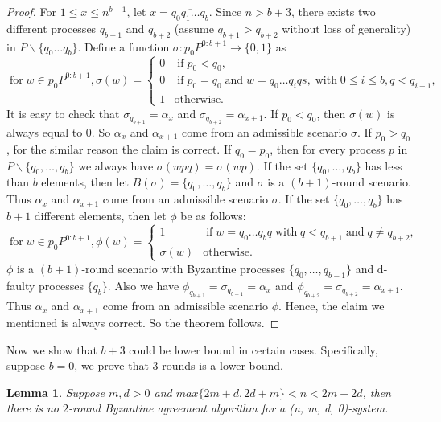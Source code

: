 \documentclass[11pt,conference,compsoc,onecolumn,romanappendices]{IEEEtran}
\newcommand{\nocomma}{}
\newcommand{\tmop}[1]{\ensuremath{\operatorname{#1}}}
\newtheorem{lemma}{Lemma}
\begin{document}
\begin{proof}
  For $1 \leqslant x \leqslant n^{b + 1}$, let $x = \overline{q_0 q_1 \ldots
  q_b}$. Since $n > b + 3$, there exists two different processes $q_{b + 1}$
  and $q_{b + 2}$ (assume $q_{b + 1} > q_{b + 2}$ without loss of generality)
  in $P \backslash \{ q_0 \ldots q_b \}$. Define a function $\sigma : p_0 P^{0 : b +
  1} \rightarrow \{ 0, 1 \}$ as
  \[ \tmop{for} w \in p_0 P^{0 : b + 1} \nocomma, \sigma (w) = \left\{
     \begin{array}{ll}
       0 & \tmop{if} p_0 < q_0,\\
       0 & \tmop{if} p_0 = q_0 \tmop{and} w = q_0 \ldots q_i q s, \tmop{with}
       0 \leqslant i \leqslant b, q < q_{i + 1},\\
       1 & \tmop{otherwise.}
     \end{array} \right. \]
  It is easy to check that $\sigma_{q_{b + 1}} = \alpha_x$ and $\sigma_{q_{b +
  2}} = \alpha_{x + 1}$. If $p_0 < q_0$, then $\sigma (w)$ is always equal to
  $0$. So $\alpha_x$ and $\alpha_{x + 1}$ come from an admissible scenario
  $\sigma$. If $p_0 > q_0$, for the similar reason the claim is correct. If
  $q_0 = p_0$, then for every process $p$ in $P \backslash \{ q_0, \ldots, q_b \}$ we
  always have $\sigma (w p q) = \sigma (w p)$. If the set $\{
  q_0, \ldots, q_b \}$ has less than $b$ elements, then let $B (\sigma) = \{
  q_0, \ldots, q_b \}$ and $\sigma$ is a $(b + 1)$-round scenario. Thus
  $\alpha_x$ and $\alpha_{x + 1}$ come from an admissible scenario $\sigma$.
  If the set $\{ q_0, \ldots, q_b \}$ has $b + 1$ different elements, then let
  $\phi$ be as follows:
  \[ \tmop{for} w \in p_0 P^{0 : b + 1} \nocomma, \phi (w) = \left\{
     \begin{array}{ll}
       1 & \tmop{if} w = q_0 \ldots q_b q \tmop{with} q < q_{b + 1} \tmop{and}
       q \neq q_{b + 2},\\
       \sigma (w) & \tmop{otherwise.}
     \end{array} \right. \]
  $\phi$ is a $(b + 1)$-round scenario with Byzantine processes $\{ q_0,
  \ldots, q_{b - 1} \}$ and d-faulty processes $\{ q_b \}$. Also we have
  $\phi_{q_{b + 1}} = \sigma_{q_{b + 1}} = \alpha_x$ and $\phi_{q_{b + 2}} =
  \sigma_{q_{b + 2}} = \alpha_{x + 1}$. Thus $\alpha_x$ and $\alpha_{x + 1}$
  come from an admissible scenario $\phi$. Hence, the claim we mentioned is
  always correct. So the theorem follows.
\end{proof}

Now we show that $b + 3$ could be lower bound in certain cases. Specifically,
suppose $b = 0$, we prove that $3$ rounds is a lower bound.
\begin{lemma}
Suppose $m, d > 0$ and $max \{2 m + d, 2 d + m\} < n < 2 m + 2 d$, then there is no
$2$-round Byzantine agreement algorithm for a (n, m, d, 0)-system.
\end{lemma}
\end{document}
